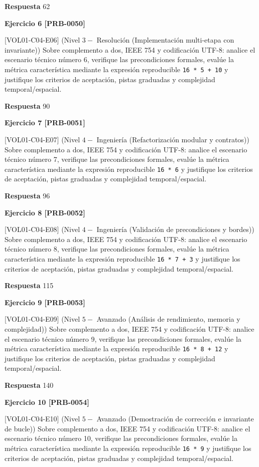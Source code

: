 \documentclass{book}
\begin{document}
\noindent\textbf{Respuesta} 62

\noindent\textbf{Ejercicio 6 [PRB-0050]}

[VOL01-C04-E06] (Nivel \(3 -\) Resolución (Implementación multi-etapa con invariante)) Sobre complemento a dos, IEEE 754 y codificación UTF-8: analice el escenario técnico número 6, verifique las precondiciones formales, evalúe la métrica característica mediante la expresión reproducible \texttt{16 * 5 + 10} y justifique los criterios de aceptación, pistas graduadas y complejidad temporal/espacial.

\noindent\textbf{Respuesta} 90

\noindent\textbf{Ejercicio 7 [PRB-0051]}

[VOL01-C04-E07] (Nivel \(4 -\) Ingeniería (Refactorización modular y contratos)) Sobre complemento a dos, IEEE 754 y codificación UTF-8: analice el escenario técnico número 7, verifique las precondiciones formales, evalúe la métrica característica mediante la expresión reproducible \texttt{16 * 6} y justifique los criterios de aceptación, pistas graduadas y complejidad temporal/espacial.

\noindent\textbf{Respuesta} 96

\noindent\textbf{Ejercicio 8 [PRB-0052]}

[VOL01-C04-E08] (Nivel \(4 -\) Ingeniería (Validación de precondiciones y bordes)) Sobre complemento a dos, IEEE 754 y codificación UTF-8: analice el escenario técnico número 8, verifique las precondiciones formales, evalúe la métrica característica mediante la expresión reproducible \texttt{16 * 7 + 3} y justifique los criterios de aceptación, pistas graduadas y complejidad temporal/espacial.

\noindent\textbf{Respuesta} 115

\noindent\textbf{Ejercicio 9 [PRB-0053]}

[VOL01-C04-E09] (Nivel \(5 -\) Avanzado (Análisis de rendimiento, memoria y complejidad)) Sobre complemento a dos, IEEE 754 y codificación UTF-8: analice el escenario técnico número 9, verifique las precondiciones formales, evalúe la métrica característica mediante la expresión reproducible \texttt{16 * 8 + 12} y justifique los criterios de aceptación, pistas graduadas y complejidad temporal/espacial.

\noindent\textbf{Respuesta} 140

\noindent\textbf{Ejercicio 10 [PRB-0054]}

[VOL01-C04-E10] (Nivel \(5 -\) Avanzado (Demostración de corrección e invariante de bucle)) Sobre complemento a dos, IEEE 754 y codificación UTF-8: analice el escenario técnico número 10, verifique las precondiciones formales, evalúe la métrica característica mediante la expresión reproducible \texttt{16 * 9} y justifique los criterios de aceptación, pistas graduadas y complejidad temporal/espacial.
\end{document}
